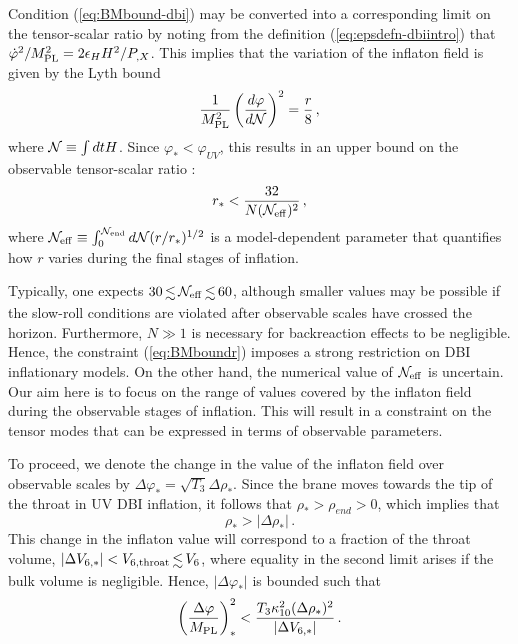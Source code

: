Condition (\ref{eq:BMbound-dbi}) may be converted into a 
corresponding limit on the tensor-scalar ratio by noting from 
the definition (\ref{eq:epsdefn-dbiintro})
that $\dot{\varphi}^2 /M_{\mathrm{PL}}^2 = 2\epsilon_H H^2/P_{,X}$.
This implies that the variation of the inflaton field 
is given by the Lyth bound 
\cite{lyth,bmpaper}
% 
\begin{equation}
\label{eq:rtheory}
\frac{1}{M_{\mathrm{PL}}^2} \left( \frac{d\varphi}{d {\cal{N}}} \right)^2 =
\frac{r}{8} \,,
\end{equation}
% 
where ${\cal{N}} \equiv \int dt H$. 
Since $\varphi_* < \varphi_{UV}$, this 
results in an upper bound on the observable tensor-scalar ratio
\cite{bmpaper}: 
% 
\begin{equation}
\label{eq:BMboundr}
r_*  < \frac{32}{N ({\cal{N}}_{\mathrm{eff}})^2} \,,
\end{equation}
% 
where ${\cal{N}}_{\mathrm{eff}} \equiv 
\int^{{\cal{N}}_{\mathrm{end}}}_0 d {\cal{N}} (r/r_*)^{1/2}$ 
is a model-dependent parameter that quantifies 
how $r$ varies during the final stages of inflation.  

Typically, one expects $30 \, \lsim \, {{\cal{N}}_{\mathrm{eff}}} 
\, \lsim \, 60$, 
although smaller values may be possible if the slow-roll conditions are 
violated after observable scales have crossed the horizon. 
Furthermore, $N \gg 1$ is necessary 
for backreaction effects to be negligible. 
 Hence, the constraint (\ref{eq:BMboundr}) 
imposes a strong restriction on DBI inflationary models. 
On the other hand, the numerical value 
of ${\cal{N}}_{\mathrm{eff}}$ is uncertain.  
Our aim here is to focus on the range of values covered by the 
inflaton field during the observable stages of inflation. 
This will result in a constraint on the tensor modes that 
can be expressed in terms of observable parameters.  


To proceed, we denote the change in the value of the inflaton field over 
observable scales by 
$\Delta  \varphi _{*} = \sqrt{T_3} \Delta \rho_{*}$. 
Since the brane moves towards the tip of the throat in 
UV DBI inflation, it follows that $\rho_{*} > \rho_{end} >0$, which 
implies that  
% 
\begin{equation}
\label{eq:importantbound}
\rho_{*} > |\Delta \rho _{*}| \,.
\end{equation}
% 
This change in the inflaton value will correspond 
to a fraction of the throat volume, 
$| \Delta V _{6,*}|  < {V_{6,\mathrm{throat}}} \, \lsim \, {V_6} $,
where equality in the second limit arises if
the bulk volume is negligible. Hence, 
$| \Delta \varphi_* |$ is bounded such that  
% 
\begin{equation}
\label{eq:halfwayconstraint}
\left( \frac{\Delta \varphi}{M_{\mathrm{PL}}} \right)^2_{*} < 
\frac{T_3 \kappa_{10}^2 (\Delta \rho_{*})^2}{|\Delta V_{6,*}|} \,.
\end{equation}
%  


